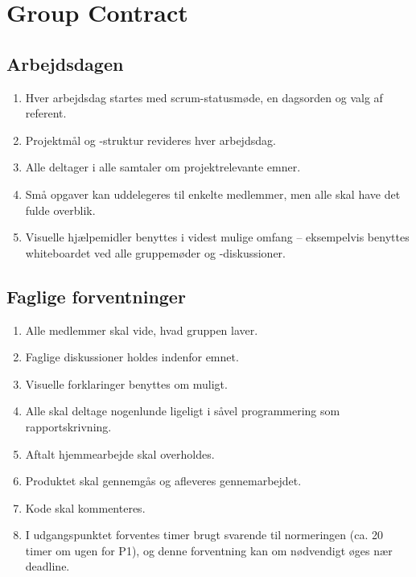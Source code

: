 \section{Group Contract}\label{app:contract}

\renewcommand*{\theenumi}{§\arabic{enumi}}

\subsection*{Arbejdsdagen}

\begin{enumerate}
  \item Hver arbejdsdag startes med scrum-statusmøde, en dagsorden og valg af referent.
  \item Projektmål og -struktur revideres hver arbejdsdag.
  \item Alle deltager i alle samtaler om projektrelevante emner.
  \item Små opgaver kan uddelegeres til enkelte medlemmer, men alle skal have det fulde overblik.
  \item Visuelle hjælpemidler benyttes i videst mulige omfang -- eksempelvis benyttes whiteboardet ved alle gruppemøder og -diskussioner.
\end{enumerate}

\subsection*{Faglige forventninger}

\begin{enumerate}
  \item Alle medlemmer skal vide, hvad gruppen laver.
  \item Faglige diskussioner holdes indenfor emnet.
  \item Visuelle forklaringer benyttes om muligt.
  \item Alle skal deltage nogenlunde ligeligt i såvel programmering som rapportskrivning.
  \item Aftalt hjemmearbejde skal overholdes.
  \item Produktet skal gennemgås og afleveres gennemarbejdet.
  \item Kode skal kommenteres.
  \item I udgangspunktet forventes timer brugt svarende til normeringen (ca. 20 timer om ugen for P1), og denne forventning kan om nødvendigt øges nær deadline.
\end{enumerate}

